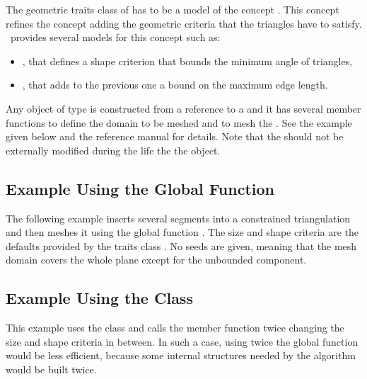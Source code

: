 The geometric traits class of  has to be a
model of the concept .  This concept
refines the concept 
adding the geometric criteria that the triangles have to satisfy.
\cgal\ provides several models for this concept such as:
\begin{itemize}
\item {}, that defines a shape criterion
  that bounds the minimum angle of triangles, 
\item {}, that adds to the previous one a
  bound on the maximum edge length.
\end{itemize}

Any object of type  is constructed from a
reference to a  and it has several member functions to define the
domain to be meshed and to mesh the . See the example given below
and the reference manual for details. Note that the  should not be
externally modified during the life the the 
object.

\subsection{Example Using the Global Function}

The following example inserts several segments into a constrained
triangulation and then meshes it using the global function
. The size and shape criteria are the defaults
provided by the traits class . No seeds are
given, meaning that the mesh domain covers the whole plane except for the
unbounded component.


\subsection{Example Using the Class }

This example uses the class  and calls
  the  member function twice changing the size and
  shape criteria in between. In such a case, using twice the global
  function  would be less efficient,
  because some internal structures needed by the algorithm would be
  built twice.


